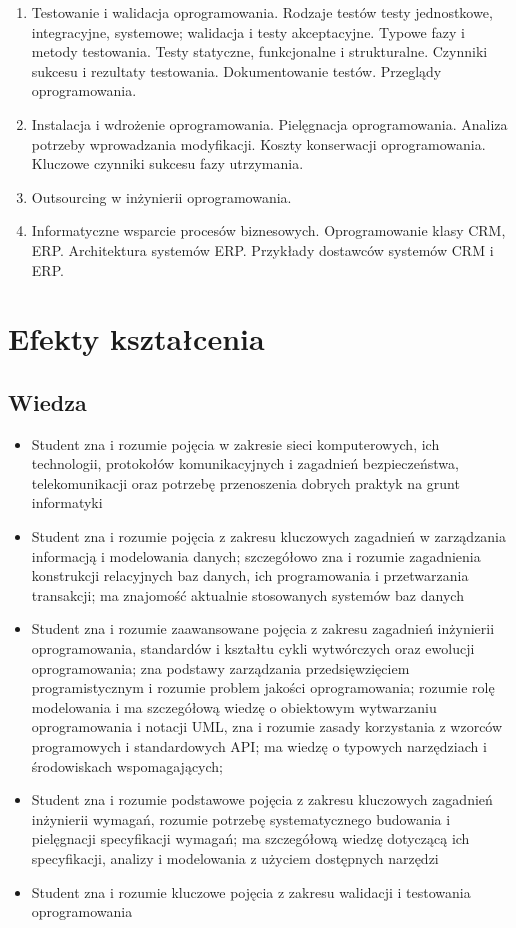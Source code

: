 \documentclass[12pt, a4paper]{article}
\begin{document}
\begin{enumerate}
  \item Testowanie i walidacja oprogramowania. Rodzaje testów testy jednostkowe, integracyjne, systemowe; walidacja i testy akceptacyjne. Typowe fazy i metody testowania. Testy statyczne, funkcjonalne i strukturalne. Czynniki sukcesu i rezultaty testowania. Dokumentowanie testów. Przeglądy oprogramowania.
  \item Instalacja i wdrożenie oprogramowania. Pielęgnacja oprogramowania. Analiza potrzeby wprowadzania modyfikacji. Koszty konserwacji oprogramowania. Kluczowe czynniki sukcesu fazy utrzymania.
  \item Outsourcing w inżynierii oprogramowania.
  \item Informatyczne wsparcie procesów biznesowych. Oprogramowanie klasy CRM, ERP. Architektura systemów ERP. Przykłady dostawców systemów CRM i ERP.
\end{enumerate}

\section{Efekty kształcenia}

\subsection*{Wiedza}
\begin{itemize}
  \item Student zna i rozumie pojęcia w zakresie sieci komputerowych, ich technologii, protokołów komunikacyjnych i zagadnień bezpieczeństwa, telekomunikacji oraz potrzebę przenoszenia dobrych praktyk na grunt informatyki
  \item Student zna i rozumie pojęcia z zakresu kluczowych zagadnień w zarządzania informacją i modelowania danych; szczegółowo zna i rozumie zagadnienia konstrukcji relacyjnych baz danych, ich programowania i przetwarzania transakcji; ma znajomość aktualnie stosowanych systemów baz danych
  \item Student zna i rozumie zaawansowane pojęcia z zakresu zagadnień inżynierii oprogramowania, standardów i kształtu cykli wytwórczych oraz ewolucji oprogramowania; zna podstawy zarządzania przedsięwzięciem programistycznym i rozumie problem jakości oprogramowania; rozumie rolę modelowania i ma szczegółową wiedzę o obiektowym wytwarzaniu oprogramowania i notacji UML, zna i rozumie zasady korzystania z wzorców programowych i standardowych API; ma wiedzę o typowych narzędziach i środowiskach wspomagających;
  \item Student zna i rozumie podstawowe pojęcia z zakresu kluczowych zagadnień inżynierii wymagań, rozumie potrzebę systematycznego budowania i pielęgnacji specyfikacji wymagań; ma szczegółową wiedzę dotyczącą ich specyfikacji, analizy i modelowania z użyciem dostępnych narzędzi
  \item Student zna i rozumie kluczowe pojęcia z zakresu walidacji i testowania oprogramowania
\end{itemize}
\end{document}
